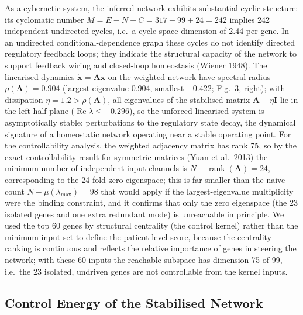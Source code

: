 \documentclass[12pt]{article}
\begin{document}
As a cybernetic system, the inferred network exhibits substantial cyclic
structure: its cyclomatic number $M = E - N + C = 317 - 99 + 24 = 242$
implies 242 independent undirected cycles, i.e.\ a cycle-space dimension of
2.44 per gene. In an undirected conditional-dependence graph these cycles do
not identify directed regulatory feedback loops; they indicate the
structural capacity of the network to support feedback wiring and
closed-loop homeostasis (Wiener 1948). The linearised dynamics
$\dot{\mathbf{x}} = \mathbf{A}\mathbf{x}$ on the weighted network have
spectral radius $\rho(\mathbf{A}) = 0.904$ (largest eigenvalue 0.904,
smallest $-0.422$; Fig.~3, right); with dissipation $\eta = 1.2 >
\rho(\mathbf{A})$, all eigenvalues of the stabilised matrix
$\mathbf{A} - \eta\mathbf{I}$ lie in the left half-plane
($\operatorname{Re}\lambda \leq -0.296$), so the unforced linearised system
is asymptotically stable: perturbations to the regulatory state decay, the
dynamical signature of a homeostatic network operating near a stable
operating point. For the controllability analysis, the weighted adjacency
matrix has rank 75, so by the exact-controllability result for symmetric
matrices (Yuan et al.\ 2013) the minimum number of independent input
channels is $N - \operatorname{rank}(\mathbf{A}) = 24$, corresponding to
the 24-fold zero eigenspace; this is far smaller than the naive count
$N - \mu(\lambda_{\max}) = 98$ that would apply if the largest-eigenvalue
multiplicity were the binding constraint, and it confirms that only the zero
eigenspace (the 23 isolated genes and one extra redundant mode) is
unreachable in principle. We used the top 60 genes by structural centrality
(the control kernel) rather than the minimum input set to define the
patient-level score, because the centrality ranking is continuous and
reflects the relative importance of genes in steering the network; with
these 60 inputs the reachable subspace has dimension 75 of 99, i.e.\ the 23
isolated, undriven genes are not controllable from the kernel inputs.

\subsection{Control Energy of the Stabilised Network}
\end{document}

